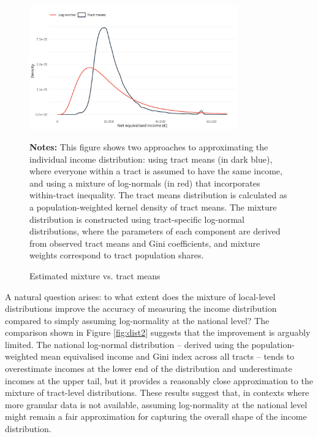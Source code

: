 \begin{figure}[H]
\begin{center}
\captionsetup{justification=centering}
\caption{Estimated mixture vs. tract means}
\label{fig:distributions}
\includegraphics[width=0.8\textwidth]{output/tract_vs_individual_income_distribution.png}
\end{center}
\begin{fignotes2}
\textbf{Notes:} This figure shows two approaches to approximating the individual income distribution: using tract means (in dark blue), where everyone within a tract is assumed to have the same income, and using a mixture of log-normals (in red) that incorporates within-tract inequality. The tract means distribution is calculated as a population-weighted kernel density of tract means. The mixture distribution is constructed using tract-specific log-normal distributions, where the parameters of each component are derived from observed tract means and Gini coefficients, and mixture weights correspond to tract population shares.
\end{fignotes2}
\end{figure}

A natural question arises: to what extent does the mixture of local-level distributions improve the accuracy of measuring the income distribution compared to simply assuming log-normality at the national level? The comparison shown in Figure \ref{fig:dist2} suggests that the improvement is arguably limited. The national log-normal distribution -- derived using the population-weighted mean equivalised income and Gini index across all tracts -- tends to overestimate incomes at the lower end of the distribution and underestimate incomes at the upper tail, but it provides a reasonably close approximation to the mixture of tract-level distributions. These results suggest that, in contexts where more granular data is not available, assuming log-normality at the national level might remain a fair approximation for capturing the overall shape of the income distribution.

